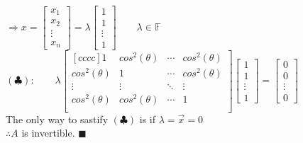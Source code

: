 \documentclass[12pt]{article}
\renewcommand{\qed}{\hfill$\blacksquare$}
\begin{document}
$\Longrightarrow x= \begin{bmatrix}
	x_1    \\x_2\\
	\vdots \\x_n
\end{bmatrix} = \lambda \begin{bmatrix}
	1      \\1\\
	\vdots \\1
\end{bmatrix} \qquad \lambda \in \mathbb{F}$\\
$(\clubsuit) : \qquad \lambda \begin{bmatrix}[cccc]
	1             & cos^2(\theta) & \cdots & cos^2(\theta) \\
	cos^2(\theta) & 1             & \cdots & cos^2(\theta) \\
	\vdots        & \vdots        & \ddots & \vdots        \\
	cos^2(\theta) & cos^2(\theta) & \cdots & 1             \\
\end{bmatrix}
\begin{bmatrix}
	1      \\1\\
	\vdots \\1
\end{bmatrix} = \begin{bmatrix}
	0      \\0\\
	\vdots \\0
\end{bmatrix}$\\
	The only way to sastify $(\clubsuit)$ is if $\lambda = \vec{x} = 0$\\
$\therefore A $ is invertible. \qed
\end{document}
